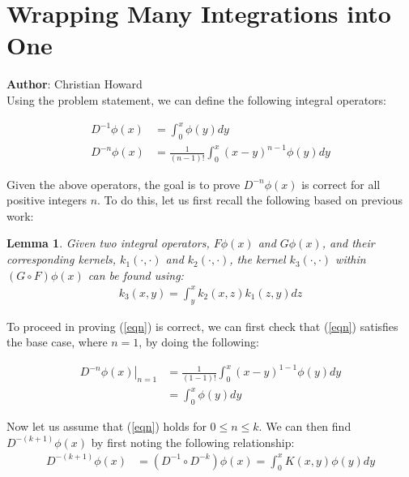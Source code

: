 \documentclass{article}[11pt]
\author{Christian Howard}
\newtheorem{lemma}{Lemma}[section]
\begin{document}
   
   \section{Wrapping Many Integrations into One}
   \textbf{Author}: Christian Howard \\
   Using the problem statement, we can define the following integral operators:
   
   \begin{align}
   D^{-1} \phi (x) &= \int_0^x \phi(y) dy \\
   D^{-n} \phi (x) &= \frac{1}{(n-1)!}\int_0^x (x-y)^{n-1}\phi(y) dy \label{eqn}
   \end{align}
   
   Given the above operators, the goal is to prove $D^{-n} \phi (x)$ is correct for all positive integers $n$. To do this, let us first recall the following based on previous work:
   
   \begin{lemma} \label{l1}
   Given two integral operators, $F\phi(x)$ and $G\phi(x)$, and their corresponding kernels, $k_1(\cdot,\cdot)$ and $k_2(\cdot,\cdot)$, the kernel $k_3(\cdot,\cdot)$ within $(G \circ F)\phi(x)$ can be found using:
	   \begin{align*}
	   k_3(x,y) = \int_y^x k_2(x,z) k_1(z,y) dz 
	   \end{align*}
   \end{lemma}
   
   To proceed in proving (\ref{eqn}) is correct, we can first check that (\ref{eqn}) satisfies the base case, where $n=1$, by doing the following:
   
   \begin{align*}
   \left. D^{-n} \phi (x)\right|_{n=1} &= \frac{1}{(1-1)!}\int_0^x (x-y)^{1-1}\phi(y) dy \\
   &= \int_0^x \phi(y) dy 
   \end{align*}
   
   Now let us assume that (\ref{eqn}) holds for $0 \leq n \leq k$. We can then find $D^{-(k+1)}\phi(x)$ by first noting the following relationship:
   \begin{align*}
   D^{-(k+1)}\phi(x) &= (D^{-1} \circ D^{-k})\phi(x) = \int_0^x K(x,y) \phi(y) dy
   \end{align*}
   
\end{document}
